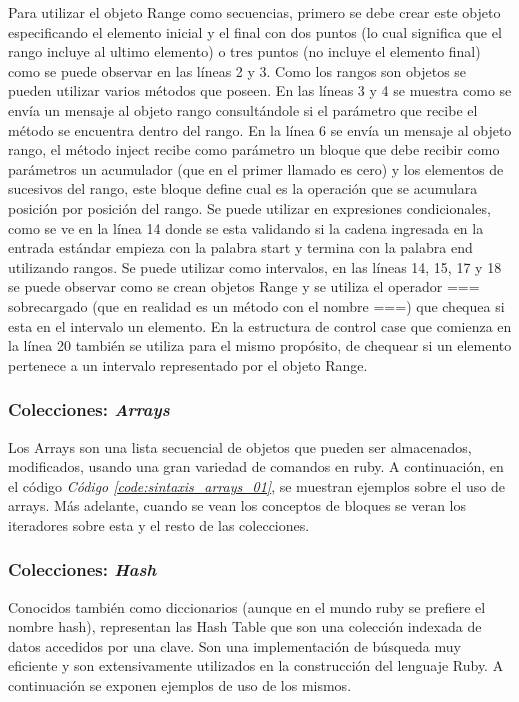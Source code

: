 \documentclass{article}
\newcommand{\refcode}[1]{\textit{Código \ref{#1}}}
\begin{document}
 
\bigskip

Para utilizar el objeto Range como secuencias, primero se debe crear este objeto especificando el elemento inicial y el final con dos puntos (lo cual significa que el rango incluye al ultimo elemento) o tres puntos (no incluye el elemento final) como se puede observar en las líneas 2 y 3. Como los rangos son objetos se pueden utilizar varios métodos que poseen. En las líneas 3 y 4 se muestra como se envía un mensaje al objeto rango consultándole si el parámetro que recibe el método se encuentra dentro del rango. En la línea 6 se envía un mensaje al objeto rango, el método inject recibe como parámetro un bloque que debe recibir como parámetros un acumulador (que en el primer llamado es cero) y los elementos de sucesivos del rango, este bloque define cual es la operación que se acumulara posición por posición del rango.
Se puede utilizar en expresiones condicionales, como se ve en la línea 14 donde se esta validando si la cadena ingresada en la entrada estándar empieza con la palabra start y termina con la palabra end  utilizando rangos.
Se puede utilizar como intervalos, en las líneas 14, 15, 17 y 18 se puede observar como se crean objetos Range y se utiliza el operador === sobrecargado (que en realidad es un método con el nombre ===) que chequea si esta en el intervalo un elemento. En la estructura de control case que comienza en la línea 20 también se utiliza para el mismo propósito, de chequear si un elemento pertenece a un intervalo representado por el objeto Range.



\subsubsection{Colecciones: \textit{Arrays}}
Los Arrays son una lista secuencial de objetos que pueden ser almacenados,  modificados,  usando una gran variedad de comandos en ruby.  
A continuación, en el código \refcode{code:sintaxis_arrays_01}, se muestran ejemplos sobre el uso de arrays. Más adelante, cuando se vean los conceptos de bloques se veran los iteradores sobre esta y el resto de las colecciones.

 
\bigskip

\subsubsection{Colecciones: \textit{Hash}}
Conocidos también como diccionarios (aunque en el mundo ruby se prefiere el nombre hash), representan las Hash Table que son una colección indexada de datos accedidos por una clave. Son una implementación de búsqueda muy eficiente y son extensivamente utilizados en la construcción del lenguaje Ruby. A continuación se exponen ejemplos de uso de los mismos.
\end{document}
